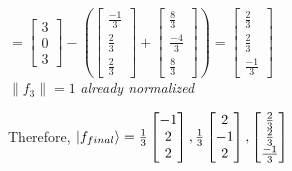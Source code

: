 \documentclass[12pt]{article}
\theoremstyle{plain}
\theoremstyle{nonumberplain}
\theoremstyle{plain}
\theoremstyle{nonumberplain}
\newcommand\1{{\bf 1}}
\newcommand{\bmat}[1]{\begin{bmatrix*} #1 \end{bmatrix*}} %
\newcommand{\<}{\left\langle}
\renewcommand{\>}{\right\rangle}
\newcommand{\norm}[1]{\left\lVert#1\right\rVert} %
\begin{document}
\begin{enumerate}
\begin{center}
$=\bmat{3 \\ 0 \\ 3}-\left( \bmat{\frac{-1}{3} \\ \frac{2}{3} \\ \frac{2}{3}} + \bmat{\frac{8}{3} \\ \frac{-4}{3} \\ \frac{8}{3}} \right) =\bmat{\frac{2}{3} \\ \frac{2}{3} \\ \frac{-1}{3}}$ \\
$\norm{f_3}=1$ \textit{already normalized}
\end{center}
\end{enumerate}
Therefore, $\ket{f_{final}}=\frac{1}{3}\bmat{-1 \\ 2 \\ 2}, \frac{1}{3}\bmat{2 \\ -1 \\ 2}, \bmat{\frac{2}{3} \\ \frac{2}{3} \\ \frac{-1}{3}}$


\end{document}

